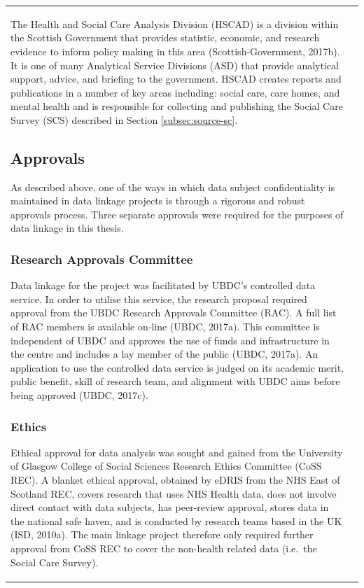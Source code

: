 \documentclass[12pt,a4paper,oneside,table]{report}
\begin{document}
\begin{tabular}[t]{ll}
The Health and Social Care Analysis Division (HSCAD) is a division
within the Scottish Government that provides statistic, economic, and
research evidence to inform policy making in this area
(Scottish-Government, 2017b). It is one of many Analytical Service
Divisions (ASD) that provide analytical support, advice, and briefing to
the government. HSCAD creates reports and publications in a number of
key areas including: social care, care homes, and mental health and is
responsible for collecting and publishing the Social Care Survey (SCS)
described in Section \ref{subsec:source-sc}.

\subsection{Approvals}\label{subsec:data-approvals}

As described above, one of the ways in which data subject
confidentiality is maintained in data linkage projects is through a
rigorous and robust approvals process. Three separate approvals were
required for the purposes of data linkage in this thesis.

\subsubsection{Research Approvals Committee}\label{subsec:rac}

Data linkage for the project was facilitated by UBDC's controlled data
service. In order to utilise this service, the research proposal
required approval from the UBDC Research Approvals Committee (RAC). A
full list of RAC members is available on-line (UBDC, 2017a). This
committee is independent of UBDC and approves the use of funds and
infrastructure in the centre and includes a lay member of the public
(UBDC, 2017a). An application to use the controlled data service is
judged on its academic merit, public benefit, skill of research team,
and alignment with UBDC aims before being approved (UBDC, 2017c).

\subsubsection{Ethics}\label{subsec:ethics}

Ethical approval for data analysis was sought and gained from the
University of Glasgow College of Social Sciences Research Ethics
Committee (CoSS REC). A blanket ethical approval, obtained by eDRIS from
the NHS East of Scotland REC, covers research that uses NHS Health data,
does not involve direct contact with data subjects, has peer-review
approval, stores data in the national safe haven, and is conducted by
research teams based in the UK (ISD, 2010a). The main linkage project
therefore only required further approval from CoSS REC to cover the
non-health related data (i.e.~the Social Care Survey).


\end{tabular}
\end{document}
